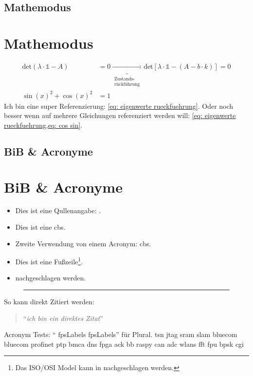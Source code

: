 \documentclass[./\jobname.tex]{subfiles}
\begin{document}
%
\blindmathtrue
\blinddocument
%
\if\paper\FHVmode
	\section{Mathemodus}
\else
	\chapter{Mathemodus}
\fi
%
\begin{align}
\text{det}(\lambda \cdot \mathds{1} -A) &= 0 \underbrace{\longrightarrow}_{\substack{\text{Zustands-} \\ \text{rückführung}}} \text{det}\left[\lambda\cdot \mathds{1} - \left(A-b\cdot k\right)\right]=0\label{eq: eigenwerte rueckfuehrung}\\
\sin(x)^{2} + \cos(x)^{2} &= 1\label{eq: cos sin}
\end{align}
%
Ich bin eine super Referenzierung: \cref{eq: eigenwerte rueckfuehrung}. Oder noch besser wenn auf mehrere Gleichungen referenziert werden will: \cref{eq: eigenwerte rueckfuehrung,eq: cos sin}.
%
\if\paper\FHVmode
	\section{BiB \& Acronyme}
\else
	\chapter{BiB \& Acronyme}
\fi
%
\begin{itemize}
	\item Dies ist eine Qullenangabe: \parencite[Vgl.][S.220-224]{IEEE802.1Q2014}.
	\item Dies ist eine \gls{cbs}.
	\item Zweite Verwendung von einem Acronym: \gls{cbs}.
	\item Dies ist eine Fußzeile\footnote{Das ISO/OSI Model kann in \cite[][S.2-9]{Mandl2010} nachgeschlagen werden.}.
	\item \textcite[][S.2-9]{Mandl2010} nachgeschlagen werden.
\end{itemize}
%
\begin{figure}
	\centering
	\rule{1cm}{1cm}
\end{figure}
%
So kann direkt Zitiert werden:
%
\begin{quote}
	\enquote{\textit{ich bin ein direktes Zitat}} \cite{Broster2001}
\end{quote}
%
Acronym Tests: \enquote{ \glspl{fpsLabel} \glspl{fpsLabel}} für Plural.
%
\newpage
%
\gls{tsn} \gls{jtag} \gls{sram} \gls{slam} \gls{bluecom} \gls{bluecom} \gls{profinet} \gls{ptp} \gls{bmca} \gls{dns} \gls{fpga} \gls{ack} \gls{bb} \gls{raspy} \gls{can} \gls{adc} \glspl{wlan} \gls{fft} \gls{fpu} \gls{bpsk} \gls{cgi}\par
%
\blindtext[1]
%
\if\paper\FHVmode
\end{document}
